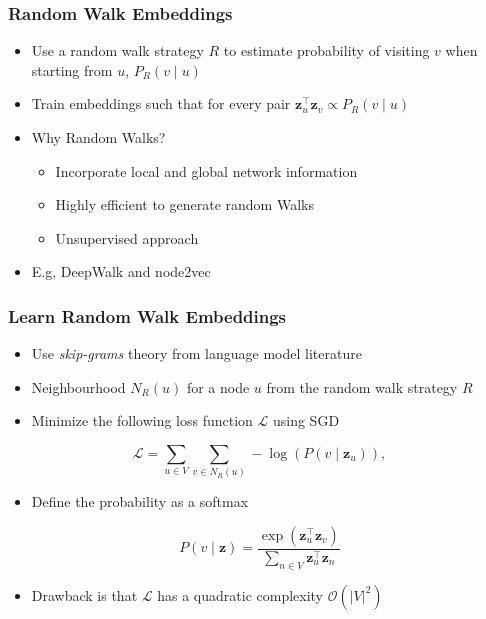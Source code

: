 \documentclass{beamer}
\begin{document}
\begin{frame}
    \frametitle{Random Walk Embeddings}
    \begin{itemize}
        \item Use a random walk strategy $R$ to estimate probability of visiting $v$ when starting from $u$, $P_{R}(v\mid u)$
        \item Train embeddings such that for every pair $\mathbf{z}_{u}^{\top}\mathbf{z}_{v} \propto P_{R}(v\mid u)$
        \item Why Random Walks?
        \begin{itemize}
            \item Incorporate local and global network information
            \item Highly efficient to generate random Walks
            \item Unsupervised approach
        \end{itemize}
        \item E.g, DeepWalk \cite{Perozzi_2014} and node2vec \cite{Grover_2016}
    \end{itemize}
\end{frame}


\begin{frame}
    \frametitle{Learn Random Walk Embeddings}
    \begin{itemize}
        \item Use \textit{skip-grams} theory from language model literature \cite{mikolov2013distributed}
        \item Neighbourhood $N_{R}(u)$ for a node $u$ from the random walk strategy $R$  
        \item Minimize the following loss function $\mathcal{L}$ using SGD
    \end{itemize}
    \[ \mathcal{L} = \sum_{u\in V}\sum_{v \in N_{R}(u)} -\log\left( P(v\mid \mathbf{z}_{u}) \right),  \]
    \begin{itemize}
        \item Define the probability as a softmax
    \end{itemize}
    \[P(v \mid \mathbf{z}) = \frac{\exp(\mathbf{z}_{u}^{\top}\mathbf{z}_{v})}{\sum_{n \in V}\mathbf{z}_{u}^{\top}\mathbf{z}_{n}} \]
    \begin{itemize}
        \item Drawback is that $\mathcal{L}$ has a quadratic complexity $\mathcal{O}(|V|^{2})$
    \end{itemize}
\end{frame}
\end{document}
